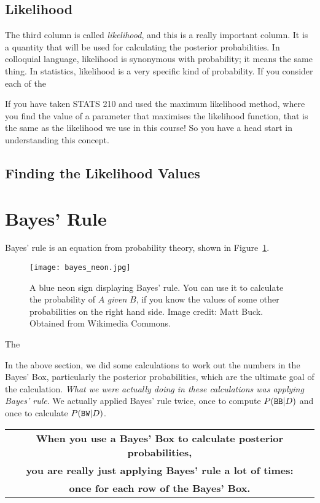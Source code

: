 \subsection{Likelihood}
The third column is called {\it likelihood}, and this is a really important
column. It is a quantity that will be used for calculating the posterior
probabilities. In colloquial language, likelihood is synonymous with
probability; it means the same thing. In statistics, likelihood is a very
specific kind of probability. If you consider each of the 


If you have taken STATS 210 and used the maximum likelihood method, where you
find the value of a parameter that maximises the likelihood function, that is
the same as the likelihood we use in this course! So you have a head start
in understanding this concept.

\subsection{Finding the Likelihood Values}

\section{Bayes' Rule}
Bayes' rule is an equation from probability theory, shown in
Figure~\ref{fig:bayes_neon}.

\begin{figure}
\begin{center}
\texttt{[image: bayes\_neon.jpg]}
\caption{A blue neon sign displaying Bayes' rule.
You can use it to calculate the probability of $A$ {\it given} $B$,
if you know the values of some other probabilities on the right hand side.
Image credit: Matt Buck. Obtained from Wikimedia Commons.
\label{fig:bayes_neon}}
\end{center}
\end{figure}

The 

In the above section, we did some calculations to work out the numbers in the
Bayes' Box, particularly the posterior probabilities, which are the ultimate
goal of the calculation. {\it What we were actually doing in these calculations
was applying Bayes' rule}. We actually applied Bayes' rule twice, once to
compute $P(\texttt{BB} | D)$ and once to calculate $P(\texttt{BW} | D)$.


\begin{center}
\begin{tabular}{|c|}
\hline
{\bf When you use a Bayes' Box to calculate posterior probabilities,}\\
{\bf you are really just applying Bayes' rule a lot of times:}\\
{\bf once for each row of the Bayes' Box.}\\
\hline
\end{tabular}
\end{center}





